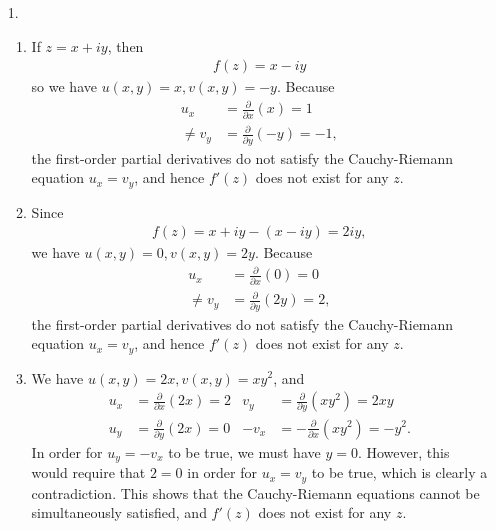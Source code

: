\documentclass[a4paper,12pt]{article}
\begin{document}
\begin{enumerate}
    \item[1.]
        \begin{enumerate}
            \item
                If $z = x + iy$, then
                \begin{align*}
                    f(z) = x - iy
                \end{align*}
                so we have $u(x, y) = x, v(x, y) = -y$. Because
                \begin{align*}
                    u_x &= \frac{\partial}{\partial x}(x) = 1 \\
                    \neq v_y &= \frac{\partial}{\partial y}(-y) = -1,
                \end{align*}
                the first-order partial derivatives do not satisfy the Cauchy-Riemann equation $u_x = v_y$, and hence $f'(z)$ does not exist for any $z$.

            \item
                Since
                \begin{align*}
                    f(z) = x + iy - (x - iy) = 2iy,
                \end{align*}
                we have $u(x, y) = 0, v(x, y) = 2y$. Because
                \begin{align*}
                    u_x &= \frac{\partial}{\partial x}(0) = 0 \\
                    \neq v_y &= \frac{\partial}{\partial y}(2y) = 2,
                \end{align*}
                the first-order partial derivatives do not satisfy the Cauchy-Riemann equation $u_x = v_y$, and hence $f'(z)$ does not exist for any $z$.

            \item
                We have $u(x, y) = 2x, v(x, y) = xy^2$, and
                \begin{align*}
                    u_x &= \frac{\partial}{\partial x}(2x) = 2 &v_y &= \frac{\partial}{\partial y}(xy^2) = 2xy \\
                    u_y &= \frac{\partial}{\partial y}(2x) = 0 &-v_x &= -\frac{\partial}{\partial x}(xy^2) = -y^2.
                \end{align*}
                In order for $u_y = -v_x$ to be true, we must have $y = 0$. However, this would require that $2 = 0$ in order for $u_x = v_y$ to be true, which is clearly a contradiction. This shows that the Cauchy-Riemann equations cannot be simultaneously satisfied, and $f'(z)$ does not exist for any $z$.


\end{enumerate}
\end{enumerate}
\end{document}
